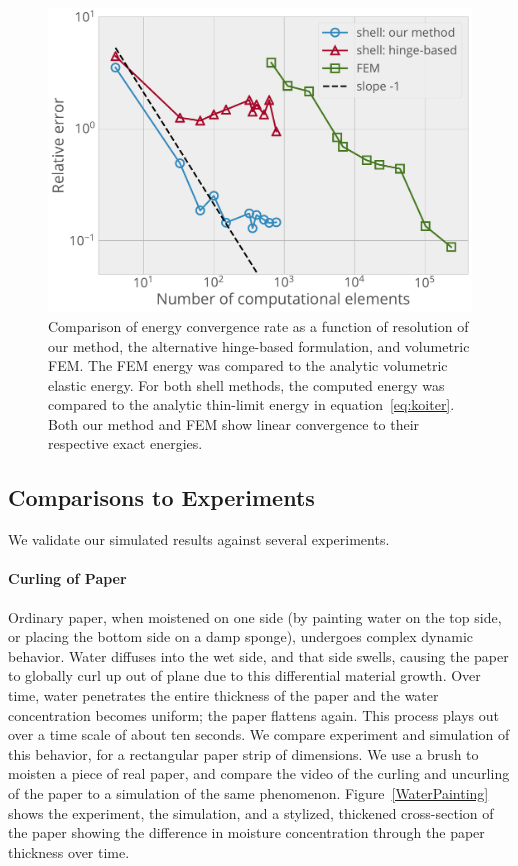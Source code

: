 \documentclass[timestamp,acmtog]{acmart}
\begin{document}
\begin{figure}[h]
  \setlength{\belowcaptionskip}{-10pt}
  \centering
  \includegraphics[width=\columnwidth]{convergenceEnergy.pdf}
  \caption{ Comparison of energy convergence rate as a function of resolution of our method, the alternative hinge-based formulation, and volumetric FEM. The FEM energy was compared to the analytic volumetric elastic energy. For both shell methods, the computed energy was compared to the analytic thin-limit energy in equation~\eqref{eq:koiter}. Both our method and FEM show linear convergence to their respective exact energies.}
  \label{fig:Convergence}
\end{figure}

\subsection{Comparisons to Experiments}
We validate our simulated results against several experiments.
\paragraph{Curling of Paper}
Ordinary paper, when moistened on one side (by painting water on the top side, or placing the bottom side on a damp sponge), undergoes complex dynamic behavior. Water diffuses into the wet side, and that side swells, causing the paper to globally curl up out of plane due to this differential material growth. Over time, water penetrates the entire thickness of the paper and the water concentration becomes uniform; the paper flattens again. This process plays out over a time scale of about ten seconds. We compare experiment and simulation of this behavior, for a rectangular paper strip of dimensions. We use a brush to moisten a piece of real paper, and compare the video of the curling and uncurling of the paper to a simulation of the same phenomenon. Figure~\ref{WaterPainting} shows the experiment, the simulation, and a stylized, thickened cross-section of the paper showing the difference in moisture concentration through the paper thickness over time.
\end{document}

